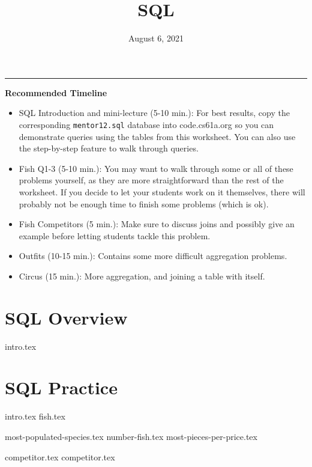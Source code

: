 \documentclass{exam}
\title{\textsc{SQL}}
\date{August 6, 2021}
\begin{document}
\maketitle\rule{\textwidth}{0.15em}
\fontsize{12}{15}\selectfont

\begin{blocksection}
\begin{guide}
\textbf{Recommended Timeline}
\begin{itemize}
  \item SQL Introduction and mini-lecture (5-10 min.): For best results, copy the corresponding 
  \texttt{mentor12.sql} database into code.cs61a.org so you can demonstrate queries using 
  the tables from this worksheet. You can also use the step-by-step feature to walk through queries.
  \item Fish Q1-3 (5-10 min.): You may want to walk through some or all of 
  these problems yourself, as they are more straightforward than the rest of
  the worksheet. If you decide to let your students work on it themselves, there will
  probably not be enough time to finish some problems (which is ok).
  \item Fish Competitors (5 min.): Make sure to discuss joins and possibly give an example
  before letting students tackle this problem.
  \item Outfits (10-15 min.): Contains some more difficult aggregation problems.
  \item Circus (15 min.): More aggregation, and joining a table with itself.
\end{itemize}
\end{guide}
\end{blocksection}


\section{SQL Overview}
{intro.tex}
\newpage

\section{SQL Practice}
{intro.tex}
{fish.tex}

\begin{questions}
  {most-populated-species.tex}
  {number-fish.tex}
  {most-pieces-per-price.tex}
\end{questions}
\newpage
{competitor.tex}
{competitor.tex}
\end{document}
